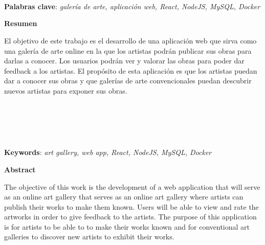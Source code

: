 \thispagestyle{empty}

\begin{center}
{\large\bfseries \titulo \\ \subtitulo }\\
\end{center}
\begin{center}
\minombre\\
\end{center}


\vspace{0.5cm}
\noindent\textbf{Palabras clave}: \textit{galería de arte, aplicación web, React, NodeJS, MySQL, Docker}
\vspace{0.7cm}

\noindent\textbf{Resumen}

\bigskip
El objetivo de este trabajo es el desarrollo de una aplicación web
que sirva como una galería de arte online en la que los artistas podrán publicar
sus obras para darlas a conocer. Los usuarios podrán ver y valorar las obras para poder
dar feedback a los artistas. El propósito de esta aplicación es que los artistas puedan
dar a conocer sus obras y que galerías de arte convencionales puedan descubrir nuevos
artistas para exponer sus obras.

\cleardoublepage

\begin{center}
	{\large\bfseries \titulo \\ \subtituloingles }\\
\end{center}
\begin{center}
	\minombre\\
\end{center}
\vspace{0.5cm}
\noindent\textbf{Keywords}: \textit{art gallery, web app, React, NodeJS, MySQL, Docker}
\vspace{0.7cm}

\noindent\textbf{Abstract}

\bigskip
The objective of this work is the development of a web application
that will serve as an online art gallery that serves as an online art
gallery where artists can publish their works to make them known.
Users will be able to view and rate the artworks in order to give
feedback to the artists. The purpose of this application is for artists
to be able to to make their works known and for conventional art
galleries to discover new artists to exhibit their works.



